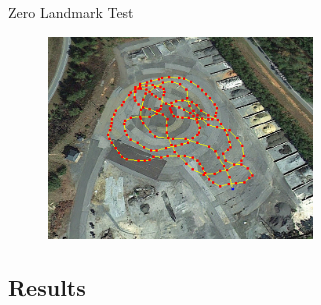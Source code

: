 \documentclass{beamer}
\begin{document}
    \begin{frame}{Zero Landmark Test}
      \begin{figure}
        \includegraphics[width=7cm]{../graphics/zero_landmark_path.png}
      \end{figure}
    \end{frame}

  \subsection{Results}
\end{document}

